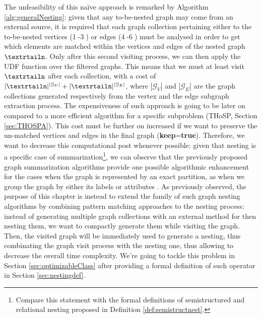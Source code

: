 The unfeasibility of this naïve approach is remarked by Algorithm \vref{alg:generalNesting}: given that any to-be-nested graph may come from an external source, it is required that each graph collection pertaining either to the to-be-nested vertices (\textcircled{\raisebox{-.5pt}1}-\textcircled{\raisebox{-.5pt}3})  or edges (\textcircled{\raisebox{-.5pt}4}-\textcircled{\raisebox{-.5pt}6}) must be  analysed in order to get which elements are matched within the vertices and edges of the nested graph $\nested$. Only after this second visiting process, we can then apply the UDF function over the filtered graphs. This means that we must at least visit $\nested$ after each collection, with a cost of $|\nested|^{|\mathcal{G}_V|}+|\nested|^{|\mathcal{G}_E|}$, where ${|\mathcal{G}_V|}$ and ${|\mathcal{G}_E|}$ are the graph collections generated respectively from the vertex and the edge subgraph extraction process. The expensiveness of such approach is going to be later on compared to a more efficient algorithm for a specific subproblem (THoSP, Section \ref{sec:THOSPA}). This cost must be further on increased if we want to preserve the un-matched vertices and edges in the final graph (\textbf{keep}=\textbf{true}). Therefore, we want to decrease this computational post whenever possible: given that nesting is a specific case of summarization\footnote{Compare this statement with the formal definitions of semistructured and relational nesting proposed in Definition \vref{def:semistructnest}.}, we can observe that the previously proposed graph summarization algorithms provide one possible algorithmic enhancement for the cases when the graph is represented by an exact partition, as when we group the graph by either its labels or attributes \cite{JunghannsPR17}. As previously observed, the purpose of this chapter is instead to extend the family of such graph nesting algorithms by combining pattern matching approaches to the nesting process: instead of generating multiple graph collections with an external method for then nesting them, we want to compactly generate them while visiting the graph. Then, the visited graph will be immediately used to generate a nesting, thus combinating the graph visit process with the nesting one, thus allowing to decrease the overall time complexity. We're going to tackle this problem in Section \vref{sec:optimizableClass} after providing a formal definition of such operator in Section \vref{sec:nestingdef}.


